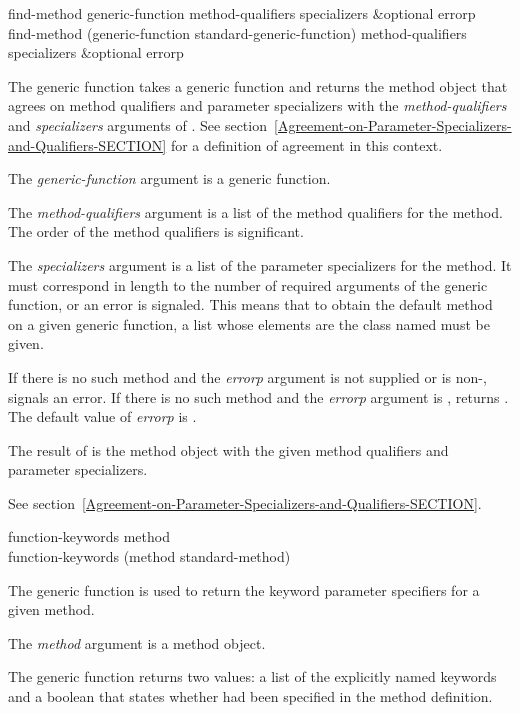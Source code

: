 \begin{defun}
find-method generic-function method-qualifiers specializers &optional errorp \\
find-method (generic-function standard-generic-function)
   method-qualifiers specializers &optional errorp

The generic function  takes a generic function and
returns the method object that agrees on method qualifiers and
parameter specializers with the \emph{method-qualifiers\/} and {\it
specializers\/} arguments of .
See section~\ref{Agreement-on-Parameter-Specializers-and-Qualifiers-SECTION} for a
definition of agreement in this context.





The \emph{generic-function\/} argument is a generic function.

The \emph{method-qualifiers\/} argument is a list of the
method qualifiers for the method.   The order of the method qualifiers
is significant.  

The \emph{specializers\/} argument is a list of the parameter
specializers for the method.  It must correspond in length to
the number of required arguments of the generic function, or
an error is signaled.  This means that to obtain the
default method on a given generic function, a list whose
elements are the class named  must be given.

If there is no such method and the \emph{errorp\/} argument is
not supplied or is non-,  signals an error.
If there is no such method and the \emph{errorp\/} argument is
,  returns .  The default value of
\emph{errorp\/} is .


The result of  is the method object with the given
method qualifiers and parameter specializers.

See section~\ref{Agreement-on-Parameter-Specializers-and-Qualifiers-SECTION}.

\end{defun}


\begin{defun}
function-keywords method \\
function-keywords (method standard-method)

The generic function  is used to return the keyword
parameter specifiers for a given method.





The \emph{method\/} argument is a method object.


The generic function  returns two values:
a list of the explicitly named keywords and a boolean that states whether
 had been specified in the method definition.

\end{defun}


